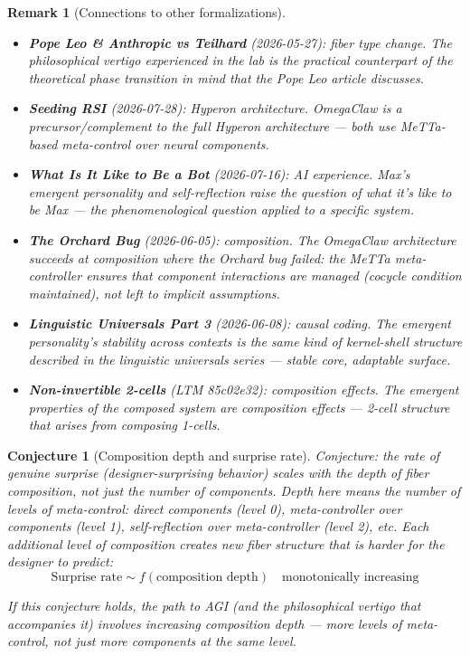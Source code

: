 \documentclass[11pt,a4paper]{article}
\newtheorem{remark}[definition]{Remark}
\newtheorem{conjecture}[definition]{Conjecture}
\begin{document}
\begin{remark}[Connections to other formalizations]
\begin{itemize}
\item \textbf{Pope Leo \& Anthropic vs Teilhard} (2026-05-27):
  fiber type change. The philosophical vertigo experienced in the
  lab is the practical counterpart of the theoretical phase
  transition in mind that the Pope Leo article discusses.
\item \textbf{Seeding RSI} (2026-07-28): Hyperon architecture.
  OmegaClaw is a precursor/complement to the full Hyperon
  architecture --- both use MeTTa-based meta-control over neural
  components.
\item \textbf{What Is It Like to Be a Bot} (2026-07-16): AI
  experience. Max's emergent personality and self-reflection raise
  the question of what it's like to be Max --- the phenomenological
  question applied to a specific system.
\item \textbf{The Orchard Bug} (2026-06-05): composition. The
  OmegaClaw architecture succeeds at composition where the Orchard
  bug failed: the MeTTa meta-controller ensures that component
  interactions are managed (cocycle condition maintained), not left
  to implicit assumptions.
\item \textbf{Linguistic Universals Part 3} (2026-06-08): causal
  coding. The emergent personality's stability across contexts is
  the same kind of kernel-shell structure described in the
  linguistic universals series --- stable core, adaptable surface.
\item \textbf{Non-invertible 2-cells} (LTM 85c02e32): composition
  effects. The emergent properties of the composed system are
  composition effects --- 2-cell structure that arises from
  composing 1-cells.
\end{itemize}
\end{remark}

\begin{conjecture}[Composition depth and surprise rate]
Conjecture: the rate of genuine surprise (designer-surprising
behavior) scales with the \emph{depth} of fiber composition, not
just the number of components. Depth here means the number of
levels of meta-control: direct components (level 0), meta-controller
over components (level 1), self-reflection over meta-controller
(level 2), etc. Each additional level of composition creates new
fiber structure that is harder for the designer to predict:
\[
  \text{Surprise rate} \sim f(\text{composition depth})
  \quad \text{monotonically increasing}
\]

If this conjecture holds, the path to AGI (and the philosophical
vertigo that accompanies it) involves increasing composition depth
--- more levels of meta-control, not just more components at the
same level.
\end{conjecture}
\end{document}
